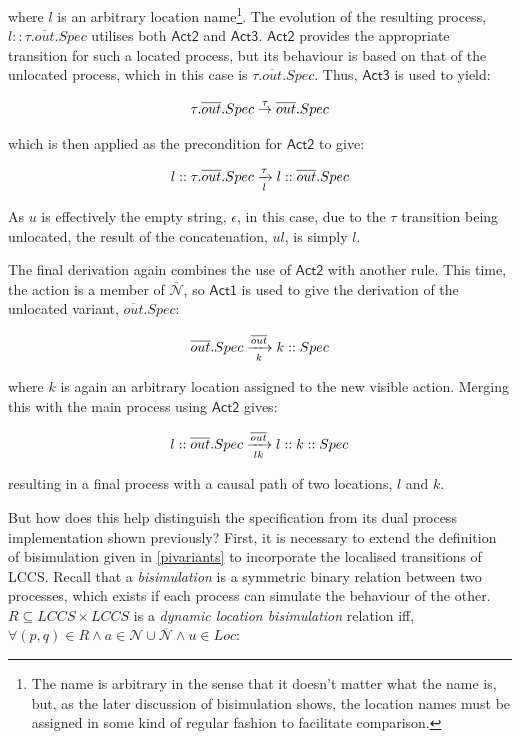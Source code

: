 \noindent where $l$ is an arbitrary location name\footnote{The name is
  arbitrary in the sense that it doesn't matter what the name is, but,
  as the later discussion of bisimulation shows, the location names
  must be assigned in some kind of regular fashion to facilitate
  comparison.}.  The evolution of the resulting process,
$l::\tau.\overline{out}.Spec$ utilises both $\textsf{Act2}$ and
$\textsf{Act3}$.  $\textsf{Act2}$ provides the appropriate transition
for such a located process, but its behaviour is based on that of the
unlocated process, which in this case is $\tau.\overline{out}.Spec$.
Thus, $\textsf{Act3}$ is used to yield:

\begin{equation}
\tau.\overline{out}.Spec \stackrel{\tau}{\rightarrow} \overline{out}.Spec
\end{equation}

\noindent which is then applied as the precondition for
$\textsf{Act2}$ to give:

\begin{equation}
l::\tau.\overline{out}.Spec \xrightarrow[l]{\tau} l::\overline{out}.Spec
\end{equation}

\noindent As $u$ is effectively the empty string, $\epsilon$, in this
case, due to the $\tau$ transition being unlocated, the result of the
concatenation, $ul$, is simply $l$.

The final derivation again combines the use of $\textsf{Act2}$ with another
rule.  This time, the action is a member of $\overline{\mathcal{N}}$,
so $\textsf{Act1}$ is used to give the derivation of the unlocated
variant, $\overline{out}.Spec$:

\begin{equation}
\overline{out}.Spec \xrightarrow[k]{\overline{out}} k::Spec
\end{equation}

\noindent where $k$ is again an arbitrary location assigned to the new
visible action.  Merging this with the main process using
$\textsf{Act2}$ gives:

\begin{equation}
l::\overline{out}.Spec \xrightarrow[lk]{\overline{out}} l::k::Spec
\end{equation}

\noindent resulting in a final process with a causal path of two
locations, $l$ and $k$.

But how does this help distinguish the specification from its dual
process implementation shown previously?  First, it is necessary to
extend the definition of bisimulation given in \ref{pivariants} to
incorporate the localised transitions of LCCS.  Recall that a
\emph{bisimulation} is a symmetric binary relation between two
processes, which exists if each process can simulate the behaviour of
the other.  $R \subseteq LCCS \times LCCS$ is a \emph{dynamic location
bisimulation} relation iff, $\forall (p,q) \in R \wedge a \in \mathcal{N}
\cup \overline{\mathcal{N}} \wedge u \in Loc$:

